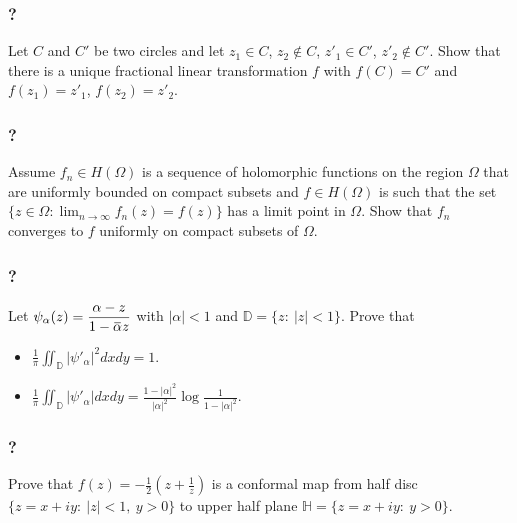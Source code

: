 \hypertarget{section-178}{%
\subsubsection{?}\label{section-178}}

Let \(C\) and \(C'\) be two circles and let \(z_1 \in C\),
\(z_2 \notin C\), \(z'_1 \in C'\), \(z'_2 \notin C'\). Show that there
is a unique fractional linear transformation \(f\) with \(f(C) = C'\)
and \(f(z_1) = z'_1\), \(f(z_2) = z'_2\).

\hypertarget{section-179}{%
\subsubsection{?}\label{section-179}}

Assume \(f_n \in H(\Omega)\) is a sequence of holomorphic functions on
the region \(\Omega\) that are uniformly bounded on compact subsets and
\(f \in H(\Omega)\) is such that the set
\(\displaystyle \{z \in \Omega: \lim_{n \rightarrow \infty} f_n(z) = f(z) \}\)
has a limit point in \(\Omega\). Show that \(f_n\) converges to \(f\)
uniformly on compact subsets of \(\Omega\).

\hypertarget{section-180}{%
\subsubsection{?}\label{section-180}}

Let
\(\displaystyle{\psi_{\alpha}(z)=\frac{\alpha-z}{1-\mkern 1.5mu\overline{\mkern-1.5mu\alpha\mkern-1.5mu}\mkern 1.5muz}}\)
with \(|\alpha|<1\) and \({\mathbb D}=\{z:\ |z|<1\}\). Prove that

\begin{itemize}
\item
  \(\displaystyle{\frac{1}{\pi}\iint_{{\mathbb D}} |\psi'_{\alpha}|^2 dx dy =1}\).
\item
  \(\displaystyle{\frac{1}{\pi}\iint_{{\mathbb D}} |\psi'_{\alpha}| dx dy =\frac{1-|\alpha|^2}{|\alpha|^2} \log \frac{1}{1-|\alpha|^2}}\).
\end{itemize}

\hypertarget{section-181}{%
\subsubsection{?}\label{section-181}}

Prove that
\(\displaystyle{f(z)=-\frac{1}{2}\left(z+\frac{1}{z}\right)}\) is a
conformal map from half disc \(\{z=x+iy:\ |z|<1,\ y>0\}\) to upper half
plane \({\mathbb H}=\{z=x+iy:\ y>0\}\).

